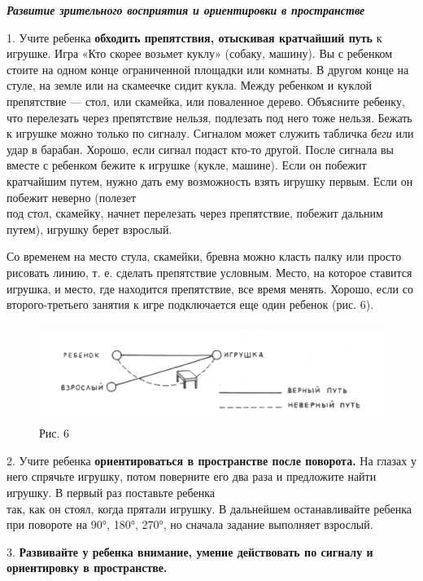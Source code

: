 \documentclass{book}
\renewcommand{\emph}[1]{\textit{#1}}
\begin{document}
\emph{\textbf{Развитие зрительного восприятия и ориентировки в
пространстве}}

1. Учите ребенка \textbf{обходить препятствия, отыскивая кратчайший
путь} к игрушке. Игра «Кто скорее возьмет куклу» (собаку, машину). Вы с
ребенком стоите на одном конце ограниченной площадки или комнаты. В
другом конце на стуле, на земле или на скамеечке сидит кукла. Между
ребенком и куклой препятствие --- стол, или скамейка, или поваленное
дерево. Объясните ребенку, что перелезать через препятствие нельзя,
подлезать под него тоже нельзя. Бежать к игрушке можно только по
сигналу. Сигналом может служить табличка \emph{беги} или удар в барабан.
Хорошо, если сигнал подаст кто-то другой. После сигнала вы вместе с
ребенком бежите к игрушке (кукле, машине). Если он побежит кратчайшим
путем, нужно дать ему возможность взять игрушку первым. Если он побежит
неверно (полезет\\
под стол, скамейку, начнет перелезать через препятствие, побежит дальним
путем), игрушку берет взрослый.

Со временем на место стула, скамейки, бревна можно класть палку или
просто рисовать линию, т. е. сделать препятствие условным. Место, на
которое ставится игрушка, и место, где находится препятствие, все время
менять. Хорошо, если со второго-третьего занятия к игре подключается еще
один ребенок (рис. 6).

\begin{figure}
\centering
\includegraphics[width=4.90972in,height=1.25in]{media/media/image6.jpg}
\caption*{Рис. 6}
\end{figure}

2. Учите ребенка \textbf{ориентироваться в пространстве после поворота.}
На глазах у него спрячьте игрушку, потом поверните его два раза и
предложите найти игрушку. В первый раз поставьте ребенка\\
так, как он стоял, когда прятали игрушку. В дальнейшем останавливайте
ребенка при повороте на 90°, 180°, 270°, но сначала задание выполняет
взрослый.

3. \textbf{Развивайте у ребенка внимание, умение действовать по сигналу
и ориентировку в пространстве.}
\end{document}
